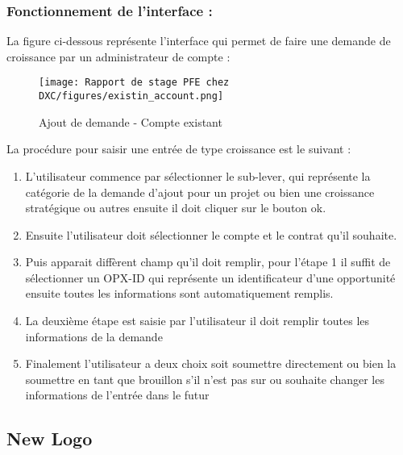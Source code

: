 \newpage

\subsubsection{Fonctionnement de l'interface :}

La figure ci-dessous représente l'interface qui permet de faire une demande de croissance par un administrateur de compte :

\begin{figure}[!h]
    \centering
    \texttt{[image: Rapport de stage PFE chez DXC/figures/existin\_account.png]}
    \caption{Ajout de demande - Compte existant}
\end{figure}

La procédure pour saisir une entrée de type croissance est le suivant :

\begin{enumerate}
    
    \item L'utilisateur commence par sélectionner le sub-lever, qui représente la catégorie de la demande d'ajout pour un projet ou bien une croissance stratégique ou autres ensuite il doit cliquer sur le bouton ok.
    \vspace{0.1cm}
    \item Ensuite l'utilisateur doit sélectionner le compte et le contrat qu'il souhaite.
    \vspace{0.1cm}
    \item Puis apparait diffèrent champ qu'il doit remplir, pour l'étape 1 il suffit de sélectionner un OPX-ID qui représente un identificateur d'une opportunité ensuite toutes les informations sont automatiquement remplis.
    \vspace{0.1cm}
    \item La deuxième étape est saisie par l'utilisateur il doit remplir toutes les informations de la demande
    \vspace{0.1cm}
    \item Finalement l'utilisateur a deux choix soit soumettre directement ou bien la soumettre en tant que brouillon s'il n'est pas sur ou souhaite changer les informations de l'entrée dans le futur

\end{enumerate}

\newpage


\subsection{New Logo}

